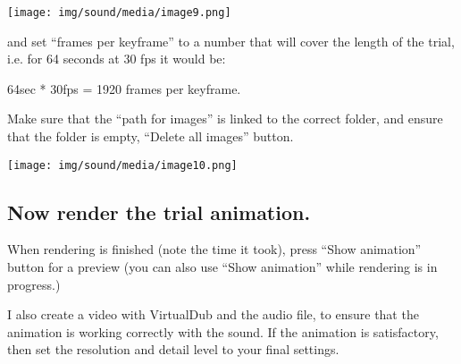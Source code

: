 \texttt{[image: img/sound/media/image9.png]}

and set ``frames per keyframe'' to a number that will cover the length
of the trial, i.e. for 64 seconds at 30 fps it would be:

64sec * 30fps = 1920 frames per keyframe.

Make sure that the ``path for images'' is linked to the correct folder,
and ensure that the folder is empty, ``Delete all images'' button.

\texttt{[image: img/sound/media/image10.png]}

\subsection{Now render the trial
animation.}\label{now-render-the-trial-animation.}

When rendering is finished (note the time it took), press ``Show
animation'' button for a preview (you can also use ``Show animation''
while rendering is in progress.)

I also create a video with VirtualDub and the audio file, to ensure that
the animation is working correctly with the sound. If the animation is
satisfactory, then set the resolution and detail level to your final
settings.
